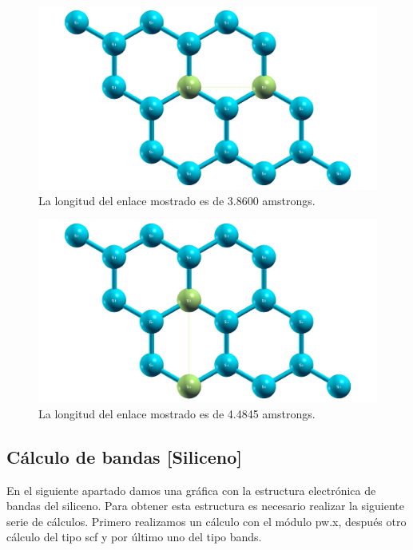 \begin{figure}[H]
    \centering
    \includegraphics[scale=0.34]{images_siliceno/longitud_enlace_3_8600_amstrongs.png}
    \caption{La longitud del enlace mostrado es de 3.8600 amstrongs.}
\end{figure}

\vspace{0.5cm}

\begin{figure}[H]
    \centering
    \includegraphics[scale=0.34]{images_siliceno/longitud_enlace_4_4845_amstrongs.png}
    \caption{La longitud del enlace mostrado es de 4.4845 amstrongs.}
\end{figure}


\newpage


\subsection{Cálculo de bandas [Siliceno]}

En el siguiente apartado damos una gráfica con la estructura electrónica de bandas del siliceno. 
Para obtener esta estructura es necesario realizar la siguiente serie de cálculos.
Primero realizamos un cálculo con el módulo pw.x, después otro cálculo 
del tipo scf y por último uno del tipo bands.

